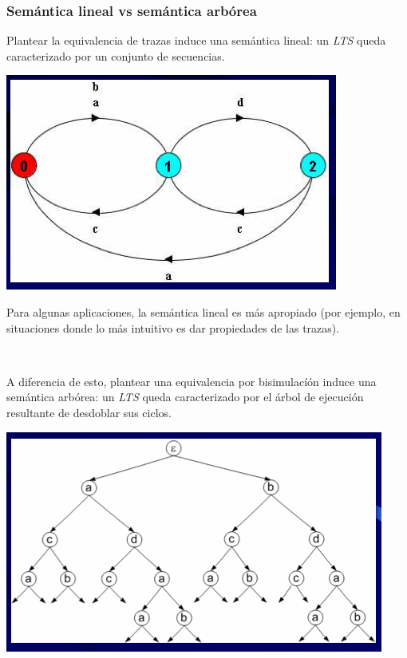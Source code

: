 \documentclass[]{article}
\begin{document}
\subsubsection{Semántica lineal vs semántica arbórea}
Plantear la equivalencia de trazas induce una semántica lineal: un \textit{LTS} queda caracterizado por un conjunto de secuencias.

\begin{center}
	\includegraphics[scale=0.5]{SemLineal.png}
\end{center}

Para algunas aplicaciones, la semántica lineal es más apropiado (por ejemplo, en situaciones donde lo más intuitivo es dar propiedades de las trazas).

~\newline

A diferencia de esto, plantear una equivalencia por bisimulacíón induce una semántica arbórea: un \textit{LTS} queda caracterizado por el árbol de ejecución resultante de desdoblar sus ciclos.

\begin{center}
	\includegraphics[scale=0.5]{SemArbol.png}
\end{center}
\end{document}
